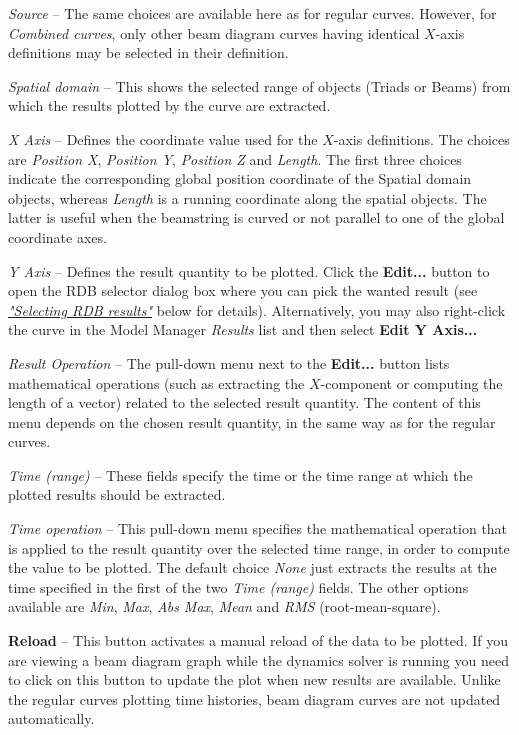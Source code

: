 \begin{bulletlist}
\item{\sl Source} --
  The same choices are available here as for regular curves.
  However, for {\sl Combined curves}, only other beam diagram curves having
  identical $X$-axis definitions may be selected in their definition.

\item{\sl Spatial domain} --
  This shows the selected range of objects (Triads or Beams)
  from which the results plotted by the curve are extracted.

\item{\sl X Axis} --
  Defines the coordinate value used for the $X$-axis definitions.
  The choices are {\sl Position X}, {\sl Position Y}, {\sl Position Z} and
  {\sl Length}. The first three choices indicate the corresponding global
  position coordinate of the Spatial domain objects, whereas {\sl Length}
  is a running coordinate along the spatial objects.
  The latter is useful when the beamstring is curved or not parallel to
  one of the global coordinate axes.

\item{\sl Y Axis} --
  Defines the result quantity to be plotted.
  Click the \textbf{Edit...} button to open the RDB selector dialog box
  where you can pick the wanted result (see
  \protect\hyperlink{selecting-rdb-results}{\sl"Selecting RDB results"}
  below for details). Alternatively, you may also right-click the curve in the
  Model Manager {\sl Results} list and then select \textbf{Edit Y Axis...}

\item{\sl Result Operation} --
  The pull-down menu next to the \textbf{Edit...} button lists mathematical
  operations (such as extracting the $X$-component or computing the length of a
  vector) related to the selected result quantity. The content of this menu
  depends on the chosen result quantity, in the same way as for the regular
  curves.

\item{\sl Time (range)} --
  These fields specify the time or the time range at which the plotted results
  should be extracted.

\item{\sl Time operation} --
  This pull-down menu specifies the mathematical operation that is applied to
  the result quantity over the selected time range, in order to compute the
  value to be plotted. The default choice {\sl None} just extracts the results
  at the time specified in the first of the two {\sl Time (range)} fields.
  The other options available are {\sl Min}, {\sl Max}, {\sl Abs Max},
  {\sl Mean} and {\sl RMS} (root-mean-square).

\item\textbf{Reload} --
  This button activates a manual reload of the data to be plotted.
  If you are viewing a beam diagram graph while the dynamics solver is running
  you need to click on this button to update the plot when new results are
  available. Unlike the regular curves plotting time histories,
  beam diagram curves are not updated automatically.
\end{bulletlist}

